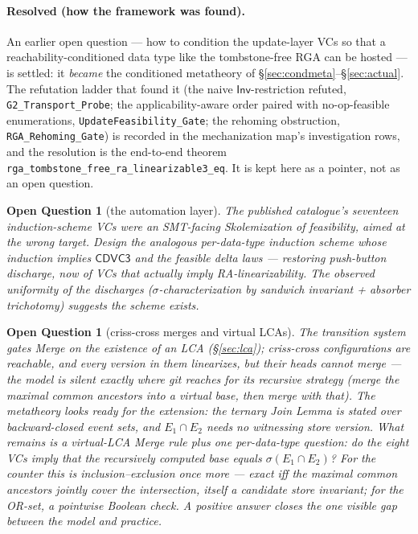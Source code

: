 \documentclass[11pt]{article}
\newtheorem{openq}[theorem]{Open Question}
\newcommand{\cd}{\mathsf{CDVC3}}
\newcommand{\lean}[1]{\texttt{#1}}
\begin{document}
\paragraph{Resolved (how the framework was found).} An earlier open
question --- how to condition the update-layer VCs so that a
reachability-conditioned data type like the tombstone-free RGA can be hosted
--- is settled: it \emph{became} the conditioned metatheory of
\S\ref{sec:condmeta}--\S\ref{sec:actual}. The refutation ladder that found it
(the naive $\mathsf{Inv}$-restriction refuted, \lean{G2\_Transport\_Probe};
the applicability-aware order paired with no-op-feasible enumerations,
\lean{UpdateFeasibility\_Gate}; the rehoming obstruction,
\lean{RGA\_Rehoming\_Gate}) is recorded in the mechanization map's
investigation rows, and the resolution is the end-to-end theorem
\lean{rga\_tombstone\_free\_ra\_linearizable3\_eq}. It is kept here as a
pointer, not as an open question.

\begin{openq}[the automation layer]
The published catalogue's seventeen induction-scheme VCs were an
SMT-facing Skolemization of feasibility, aimed at the wrong target.
Design the analogous per-data-type induction scheme whose induction
implies $\cd$ and the feasible delta laws --- restoring push-button
discharge, now of VCs that actually imply RA-linearizability. The
observed uniformity of the discharges ($\sigma$-characterization by
sandwich invariant + absorber trichotomy) suggests the scheme exists.
\end{openq}

\begin{openq}[criss-cross merges and virtual LCAs]
\label{oq:crisscross}
The transition system gates Merge on the existence of an LCA
(\S\ref{sec:lca}); criss-cross configurations are reachable, and every
version in them linearizes, but their heads cannot merge --- the model
is silent exactly where git reaches for its \emph{recursive} strategy
(merge the maximal common ancestors into a virtual base, then merge with
that). The metatheory looks ready for the extension: the ternary Join
Lemma is stated over backward-closed \emph{event sets}, and
$E_1 \cap E_2$ needs no witnessing store version. What remains is a
virtual-LCA Merge rule plus one per-data-type question: do the eight VCs
imply that the recursively computed base equals
$\sigma(E_1 \cap E_2)$? For the counter this is inclusion--exclusion
once more --- exact iff the maximal common ancestors jointly cover the
intersection, itself a candidate store invariant; for the OR-set, a
pointwise Boolean check. A positive answer closes the one visible gap
between the model and practice.
\end{openq}
\end{document}
